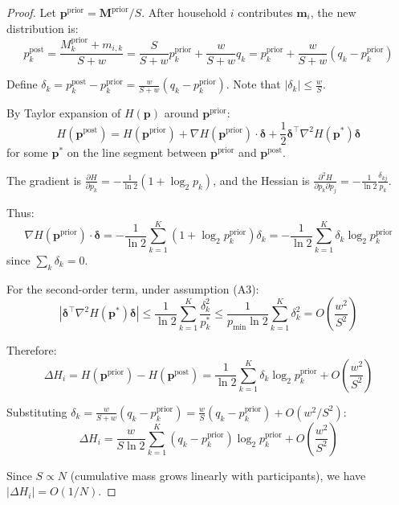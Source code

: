 \documentclass[12pt,a4paper]{article}
\begin{document}
\begin{proof}
Let $\mathbf{p}^{\text{prior}} = \mathbf{M}^{\text{prior}}/S$. After household $i$ contributes $\mathbf{m}_i$, the new distribution is:
\begin{equation}
p_k^{\text{post}} = \frac{M_k^{\text{prior}} + m_{i,k}}{S + w} = \frac{S}{S+w} p_k^{\text{prior}} + \frac{w}{S+w} q_k = p_k^{\text{prior}} + \frac{w}{S+w}(q_k - p_k^{\text{prior}})
\end{equation}

Define $\delta_k = p_k^{\text{post}} - p_k^{\text{prior}} = \frac{w}{S+w}(q_k - p_k^{\text{prior}})$. Note that $|\delta_k| \leq \frac{w}{S}$.

By Taylor expansion of $H(\mathbf{p})$ around $\mathbf{p}^{\text{prior}}$:
\begin{equation}
H(\mathbf{p}^{\text{post}}) = H(\mathbf{p}^{\text{prior}}) + \nabla H(\mathbf{p}^{\text{prior}}) \cdot \boldsymbol{\delta} + \frac{1}{2} \boldsymbol{\delta}^\top \nabla^2 H(\mathbf{p}^*) \boldsymbol{\delta}
\end{equation}
for some $\mathbf{p}^*$ on the line segment between $\mathbf{p}^{\text{prior}}$ and $\mathbf{p}^{\text{post}}$.

The gradient is $\frac{\partial H}{\partial p_k} = -\frac{1}{\ln 2}(1 + \log_2 p_k)$, and the Hessian is $\frac{\partial^2 H}{\partial p_k \partial p_j} = -\frac{1}{\ln 2} \frac{\delta_{kj}}{p_k}$.

Thus:
\begin{equation}
\nabla H(\mathbf{p}^{\text{prior}}) \cdot \boldsymbol{\delta} = -\frac{1}{\ln 2} \sum_{k=1}^K (1 + \log_2 p_k^{\text{prior}}) \delta_k = -\frac{1}{\ln 2} \sum_{k=1}^K \delta_k \log_2 p_k^{\text{prior}}
\end{equation}
since $\sum_k \delta_k = 0$.

For the second-order term, under assumption (A3):
\begin{equation}
|\boldsymbol{\delta}^\top \nabla^2 H(\mathbf{p}^*) \boldsymbol{\delta}| \leq \frac{1}{\ln 2} \sum_{k=1}^K \frac{\delta_k^2}{p_k^*} \leq \frac{1}{p_{\min} \ln 2} \sum_{k=1}^K \delta_k^2 = O\left(\frac{w^2}{S^2}\right)
\end{equation}

Therefore:
\begin{equation}
\Delta H_i = H(\mathbf{p}^{\text{prior}}) - H(\mathbf{p}^{\text{post}}) = \frac{1}{\ln 2} \sum_{k=1}^K \delta_k \log_2 p_k^{\text{prior}} + O\left(\frac{w^2}{S^2}\right)
\end{equation}

Substituting $\delta_k = \frac{w}{S+w}(q_k - p_k^{\text{prior}}) = \frac{w}{S}(q_k - p_k^{\text{prior}}) + O(w^2/S^2)$:
\begin{equation}
\Delta H_i = \frac{w}{S \ln 2} \sum_{k=1}^K (q_k - p_k^{\text{prior}}) \log_2 p_k^{\text{prior}} + O\left(\frac{w^2}{S^2}\right)
\end{equation}

Since $S \propto N$ (cumulative mass grows linearly with participants), we have $|\Delta H_i| = O(1/N)$.
\end{proof}
\end{document}
